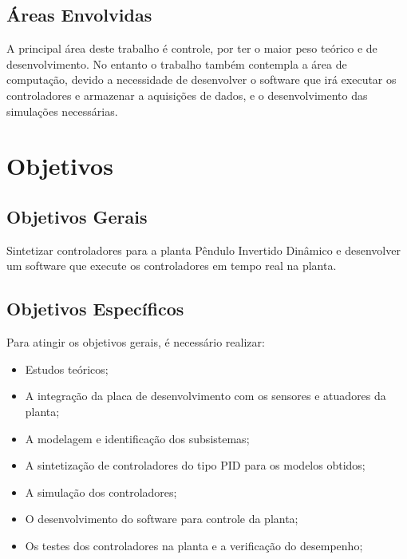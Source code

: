 \documentclass[conference,harvard,brazil,english]{sbatex}
\begin{document}
        \subsection{Áreas Envolvidas}
            
            A principal área deste trabalho é controle, por ter o maior peso teórico e de desenvolvimento. No entanto o trabalho também contempla a área de computação, devido a necessidade de desenvolver o software que irá executar os controladores e armazenar a aquisições de dados, e o desenvolvimento das simulações necessárias.
        
    \section{Objetivos}
    
        \subsection{Objetivos Gerais}
        
            Sintetizar controladores para a planta Pêndulo Invertido Dinâmico e desenvolver um software que execute os controladores em tempo real na planta.
        
        \subsection{Objetivos Específicos}
            
            Para atingir os objetivos gerais, é necessário realizar:
            \begin{itemize}
                \item Estudos teóricos;
                \item A integração da placa de desenvolvimento com os sensores e atuadores da planta;
                \item A modelagem e identificação dos subsistemas;
                \item A sintetização de controladores do tipo PID para os modelos obtidos;
                \item A simulação dos controladores;
                \item O desenvolvimento do software para controle da planta;
                \item Os testes dos controladores na planta e a verificação do desempenho;
            \end{itemize}
            
\end{document}
